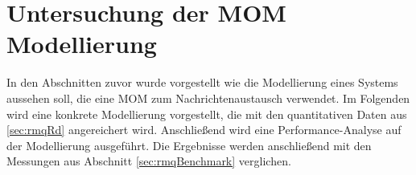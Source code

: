 








\section{Untersuchung der MOM Modellierung}
In den Abschnitten zuvor wurde vorgestellt wie die Modellierung eines Systems aussehen soll, die eine MOM zum Nachrichtenaustausch verwendet. Im Folgenden wird eine konkrete Modellierung vorgestellt, die mit den quantitativen Daten aus \autoref{sec:rmqRd} angereichert wird. Anschließend wird eine Performance-Analyse auf der Modellierung ausgeführt. Die Ergebnisse werden anschließend mit den Messungen aus Abschnitt \ref{sec:rmqBenchmark} verglichen.


